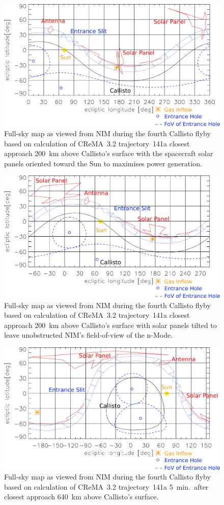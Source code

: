 	\begin{figure}[h!]
		\centering
		\includegraphics[width = .7\textwidth]{Bilder/NIM_pointing_2031JAN15195200_tilt.png}
		\caption{Full-sky map as viewed from NIM during the fourth Callisto flyby based on calculation of CReMA~3.2 trajectory~141a \cite{SOC_Crema3p2} closest approach 200~km above Callisto's surface with the spacecraft solar panels oriented toward the Sun to maximises power generation.}
		\label{fig:FlybyCal1952sol}
	\end{figure}
	\begin{figure}[h!]
		\centering
		\includegraphics[width = .7\textwidth]{Bilder/NIM_pointing_2031JAN15195200.png}
		\caption{Full-sky map as viewed from NIM during the fourth Callisto flyby based on calculation of CReMA~3.2 trajectory~141a \cite{SOC_Crema3p2} closest approach 200~km above Callisto's surface with solar panels tilted to leave unobstructed NIM's field-of-view of the n-Mode.}
		\label{fig:FlybyCal1952}
	\end{figure}
	\begin{figure}[h!]
		\centering
		\includegraphics[width = .7\textwidth]{Bilder/NIM_pointing_2031JAN15195700.png}
		\caption{Full-sky map as viewed from NIM during the fourth Callisto flyby based on calculation of CReMA~3.2 trajectory~141a \cite{SOC_Crema3p2} 5~min.\ after closest approach 640~km above Callisto's surface.}
		\label{fig:FlybyCal1957}
	\end{figure}
